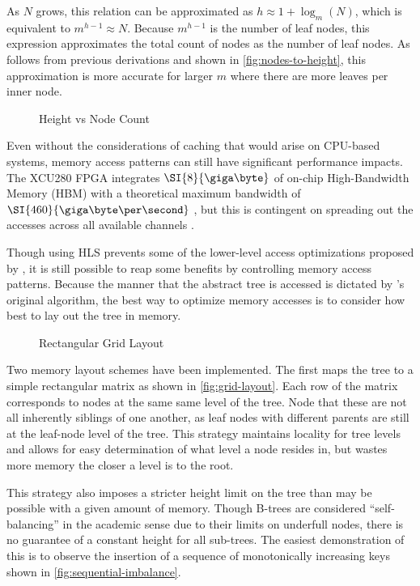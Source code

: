 As $N$ grows, this relation can be approximated as $h \approx 1 + \log_m(N)$,
which is equivalent to  $m^{h-1} \approx N$. Because $m^{h-1}$ is the number of
leaf nodes, this expression approximates the total count of nodes as the number
of leaf nodes. As follows from previous derivations and shown in
\autoref{fig:nodes-to-height}, this approximation is more accurate for larger $m$
where there are more leaves per inner node.

\begin{figure}
	\centering
	
	\caption{Height vs Node Count}
	\label{fig:nodes-to-height}
\end{figure}



Even without the considerations of caching that would arise on CPU-based
systems, memory access patterns can still have significant performance impacts.
The XCU280 FPGA integrates $\SI{8}{\giga\byte}$ of on-chip High-Bandwidth Memory
(HBM) with a theoretical maximum bandwidth of $\SI{460}{\giga\byte\per\second}$
\autocite{u280}, but this is contingent on spreading out the accesses across all
available channels \autocite{holzinger-ipdpsw-2021}.

Though using HLS prevents some of the lower-level access optimizations proposed
by \citeauthor{holzinger-ipdpsw-2021}, it is still possible to reap some
benefits by controlling memory access patterns. Because the manner that the
abstract tree is accessed is dictated by \citeauthor{b-link}'s original
algorithm, the best way to optimize memory accesses is to consider how best to
lay out the tree in memory.

\begin{figure}
	\centering
	
	\caption{Rectangular Grid Layout}
	\label{fig:grid-layout}
\end{figure}

Two memory layout schemes have been implemented. The first maps the tree to a
simple rectangular matrix as shown in \autoref{fig:grid-layout}. Each row of the
matrix corresponds to nodes at the same same level of the tree. Node that these
are not all inherently siblings of one another, as leaf nodes with different
parents are still at the leaf-node level of the tree. This strategy maintains
locality for tree levels and allows for easy determination of what level a node
resides in, but wastes more memory the closer a level is to the root.

This strategy also imposes a stricter height limit on the tree than may be
possible with a given amount of memory. Though B-trees are considered
``self-balancing'' in the academic sense due to their limits on underfull nodes,
there is no guarantee of a constant height for all sub-trees. The easiest
demonstration of this is to observe the insertion of a sequence of monotonically
increasing keys shown in \autoref{fig:sequential-imbalance}.

